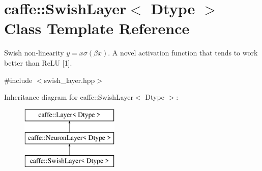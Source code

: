 \hypertarget{classcaffe_1_1SwishLayer}{}\section{caffe\+:\+:Swish\+Layer$<$ Dtype $>$ Class Template Reference}
\label{classcaffe_1_1SwishLayer}


Swish non-\/linearity $ y = x \sigma (\beta x) $. A novel activation function that tends to work better than Re\+LU \mbox{[}1\mbox{]}.  




{\ttfamily \#include $<$swish\+\_\+layer.\+hpp$>$}

Inheritance diagram for caffe\+:\+:Swish\+Layer$<$ Dtype $>$\+:\begin{figure}[H]
\begin{center}
\leavevmode
\includegraphics[height=3.000000cm]{classcaffe_1_1SwishLayer}
\end{center}
\end{figure}
